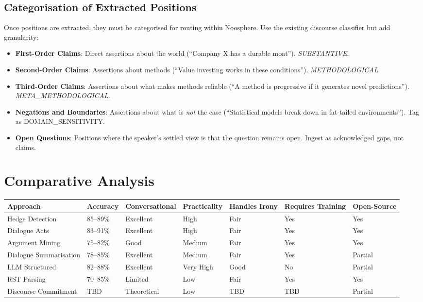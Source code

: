 \documentclass[11pt,letterpaper]{article}
\begin{document}
\subsection{Categorisation of Extracted Positions}

Once positions are extracted, they must be categorised for routing within Noosphere. Use the existing discourse classifier but add granularity:

\begin{itemize}
  \item \textbf{First-Order Claims}: Direct assertions about the world (``Company X has a durable moat''). \textit{SUBSTANTIVE}.
  \item \textbf{Second-Order Claims}: Assertions about methods (``Value investing works in these conditions''). \textit{METHODOLOGICAL}.
  \item \textbf{Third-Order Claims}: Assertions about what makes methods reliable (``A method is progressive if it generates novel predictions''). \textit{META\_METHODOLOGICAL}.
  \item \textbf{Negations and Boundaries}: Assertions about what is \textit{not} the case (``Statistical models break down in fat-tailed environments''). Tag as DOMAIN\_SENSITIVITY.
  \item \textbf{Open Questions}: Positions where the speaker's settled view is that the question remains open. Ingest as acknowledged gaps, not claims.
\end{itemize}

\section{Comparative Analysis}

\begin{center}
\begin{tabularx}{\textwidth}{lXXXXXX}
  \toprule
  \textbf{Approach} & \textbf{Accuracy} & \textbf{Conversational} & \textbf{Practicality} & \textbf{Handles Irony} & \textbf{Requires Training} & \textbf{Open-Source} \\
  \midrule
  Hedge Detection & 85–89\% & Excellent & High & Fair & Yes & Yes \\
  Dialogue Acts & 83–91\% & Excellent & High & Fair & Yes & Yes \\
  Argument Mining & 75–82\% & Good & Medium & Fair & Yes & Yes \\
  Dialogue Summarisation & 78–85\% & Excellent & Medium & Fair & Yes & Partial \\
  LLM Structured & 82–88\% & Excellent & Very High & Good & No & Partial \\
  RST Parsing & 70–85\% & Limited & Low & Fair & Yes & Yes \\
  Discourse Commitment & TBD & Theoretical & Low & TBD & TBD & Partial \\
  \bottomrule
\end{tabularx}
\end{center}
\end{document}
